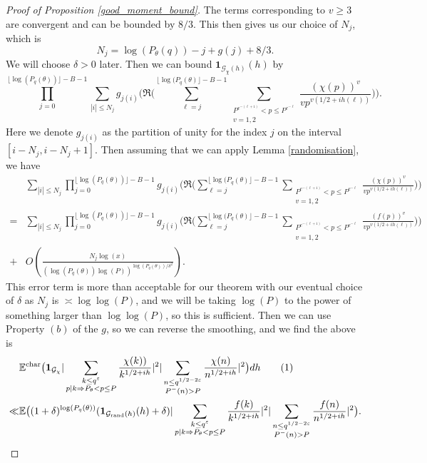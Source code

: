\documentclass[reqno]{amsart}
\theoremstyle{definition}
\theoremstyle{remark}
\numberwithin{equation}{section}
\newcommand\numberthis{\addtocounter{equation}{1}\tag{\theequation}}
\theoremstyle{remark}
\begin{document}
\begin{proof}[Proof of Proposition \ref{good_moment_bound}]
The terms corresponding to $v \geq 3$ are convergent and can be bounded by $8/3$. This then gives us our choice of $N_j$, which is
$$N_j = \log(P_\theta(q))-j+g(j)+8/3.$$
We will choose $\delta>0$ later. Then we can bound $\mathbf{1}_{\mathcal{G}_\chi(h)}(h)$ by
$$\prod_{j=0}^{\lfloor\log(P_q(\theta))\rfloor-B-1}\sum_{|i| \leq N_j}g_{j(i)}\big(\Re\big(\sum_{\ell=j}^{\lfloor\log(P_q(\theta)\rfloor - B -1}\sum_{\substack{P^{e^{-(\ell+1)}} < p \leq P^{e^{-\ell}} \\ v=1,2}}\frac{(\chi(p))^v}{vp^{v(1/2+ih(\ell))}}\big)\big).$$
Here we denote $g_{j(i)}$ as the partition of unity for the index $j$ on the interval $[i-N_j,i-N_j+1]$. Then assuming that we can apply Lemma \ref{randomisation}, we have
\begin{align*}
    &\sum_{|i| \leq N_j}\prod_{j=0}^{\lfloor\log(P_q(\theta))\rfloor-B-1}g_{j(i)}\big(\Re\big(\sum_{\ell=j}^{\lfloor\log(P_q(\theta)\rfloor - B -1}\sum_{\substack{P^{e^{-(\ell+1)}} < p \leq P^{e^{-\ell}} \\ v=1,2}}\frac{(\chi(p))^v}{vp^{v(1/2+ih(\ell))}}\big)\big) \\
    =& \sum_{|i| \leq N_j}\prod_{j=0}^{\lfloor\log(P_q(\theta))\rfloor-B-1}g_{j(i)}\big(\Re\big(\sum_{\ell=j}^{\lfloor\log(P_q(\theta)\rfloor - B -1}\sum_{\substack{P^{e^{-(\ell+1)}} < p \leq P^{e^{-\ell}} \\ v=1,2}}\frac{(f(p))^v}{vp^{v(1/2+ih(\ell))}}\big)\big)\\+&O(\frac{N_j\log(x)}{(\log(P_q(\theta))\log(P))^{\log(P_q(\theta))/\delta^2}}).
\end{align*}
This error term is more than acceptable for our theorem with our eventual choice of $\delta$ as $N_j$ is $\asymp \log\log(P)$, and we will be taking $\log(P)$ to the power of something larger than $\log\log(P)$, so this is sufficient. Then we can use Property $(b)$ of the $g$, so we can reverse the smoothing, and we find the above is
\begin{align*}
    &\mathbb{E}^{\text{char}}\big(\mathbf{1}_{\mathcal{G}_\chi}|\sum_{\substack{k \leq q^\varepsilon \\ p|k \Rightarrow P_\theta < p \leq P}}\frac{\chi(k))}{k^{1/2+ih}}|^2|\sum_{\substack{n \leq q^{1/2-2\varepsilon} \\ P^{-}(n) > P}}\frac{\chi(n)}{n^{1/2+ih}}|^2\big)dh \numberthis \label{randomed}\\ \ll& \mathbb{E}\big((1+\delta)^{\log(P_q(\theta))}(\mathbf{1}_{\mathcal{G}_{\text{rand}}(h)}(h)+\delta)|\sum_{\substack{k \leq q^\varepsilon \\ p|k \Rightarrow P_\theta < p \leq P}}\frac{f(k)}{k^{1/2+ih}}|^2|\sum_{\substack{n \leq q^{1/2-2\varepsilon} \\ P^{-}(n) > P}}\frac{f(n)}{n^{1/2+ih}}|^2\big).

\end{align*}
\end{proof}
\end{document}
